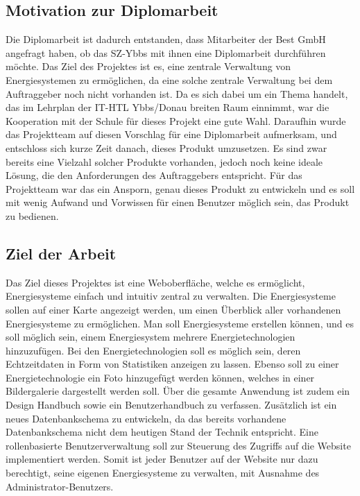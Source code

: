 \subsection{Motivation zur Diplomarbeit}
Die Diplomarbeit ist dadurch entstanden, dass Mitarbeiter der Best GmbH angefragt haben, ob das SZ-Ybbs mit ihnen eine Diplomarbeit durchführen möchte. Das Ziel des Projektes ist es, eine zentrale Verwaltung von Energiesystemen zu ermöglichen, da eine solche zentrale Verwaltung bei dem Auftraggeber noch nicht vorhanden ist. 
Da es sich dabei um ein Thema handelt, das im Lehrplan der IT-HTL Ybbs/Donau breiten Raum einnimmt, war die Kooperation mit der Schule für dieses Projekt eine gute Wahl. Daraufhin wurde das Projektteam auf diesen Vorschlag für eine Diplomarbeit aufmerksam, und entschloss sich kurze Zeit danach, dieses Produkt umzusetzen. Es sind zwar bereits eine Vielzahl solcher Produkte vorhanden, jedoch noch keine ideale Lösung, die den Anforderungen des Auftraggebers entspricht. Für das Projektteam war das ein Ansporn, genau dieses Produkt zu entwickeln und es soll mit wenig Aufwand und Vorwissen für einen Benutzer möglich sein, das Produkt zu bedienen.




\subsection{Ziel der Arbeit}
Das Ziel dieses Projektes ist eine Weboberfläche, welche es ermöglicht, Energiesysteme einfach und intuitiv zentral zu verwalten. Die Energiesysteme sollen auf einer Karte angezeigt werden, um einen Überblick aller vorhandenen Energiesysteme zu ermöglichen. Man soll Energiesysteme erstellen können, und es soll möglich sein, einem Energiesystem mehrere Energietechnologien hinzuzufügen. Bei den Energietechnologien soll es möglich sein, deren Echtzeitdaten in Form von Statistiken anzeigen zu lassen. Ebenso soll zu einer Energietechnologie ein Foto hinzugefügt werden können, welches in einer Bildergalerie dargestellt werden soll. 
Über die gesamte Anwendung ist zudem ein Design Handbuch sowie ein Benutzerhandbuch zu verfassen. Zusätzlich ist ein neues Datenbankschema zu entwickeln, da das bereits vorhandene Datenbankschema nicht dem heutigen Stand der Technik entspricht. Eine rollenbasierte Benutzerverwaltung soll zur Steuerung des Zugriffs auf die Website implementiert werden. Somit ist jeder Benutzer auf der Website nur dazu berechtigt, seine eigenen Energiesysteme zu verwalten, mit Ausnahme des Administrator-Benutzers.




